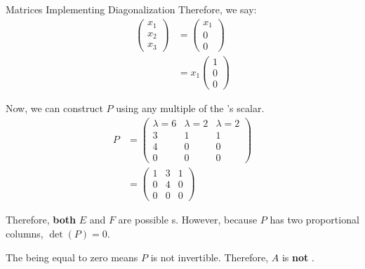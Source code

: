 \begin{example}{Matrices Implementing Diagonalization}
  Therefore, we say:
  \begin{align*}
    \begin{pmatrix}
      x_{1} \\ x_{2} \\ x_{3}
    \end{pmatrix} &=
                    \begin{pmatrix}
                      x_{1} \\ 0 \\ 0
                    \end{pmatrix} \\
    &= x_{1}
      \begin{pmatrix}
        1 \\ 0 \\ 0
      \end{pmatrix}
  \end{align*}

  Now, we can construct $P$ using any multiple of the 's scalar.
  \begin{align*}
    P &=
        \begin{pmatrix}
          \lambda = 6 & \lambda = 2 & \lambda = 2 \\
          3 & 1 & 1 \\
          4 & 0 & 0 \\
          0 & 0 & 0
        \end{pmatrix} \\
    &=
      \begin{pmatrix}
        1 & 3 & 1 \\
        0 & 4 & 0 \\
        0 & 0 & 0
      \end{pmatrix}
  \end{align*}

  Therefore, \textbf{both} $E$ and $F$ are possible s.
  However, because $P$ has two proportional columns, $\det(P) = 0$.

  The  being equal to zero means $P$ is not invertible.
  Therefore, $A$ is \textbf{not} .
\end{example}


